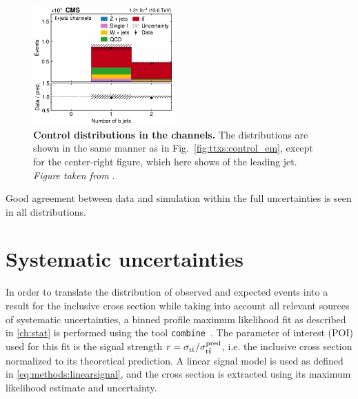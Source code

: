 \begin{figure}[!hp]
\hfill
\includegraphics[width=0.49\textwidth]{figures/ttxs/nbtag_lj.pdf}
\caption{
   \textbf{Control distributions in the \ljets channels.} The distributions are shown in the same manner as in Fig.~\ref{fig:ttxs:control_em}, except for the center-right figure, which here shows \abseta of the leading jet. \textit{Figure taken from }.
}
\label{fig:ttxs:control_ljets}
\end{figure}

Good agreement between data and simulation within the full uncertainties is seen in all distributions.



\section{Systematic uncertainties}
\label{sec:ttxs:systematics}


In order to translate the distribution of observed and expected events into a result for the inclusive \ttbar cross section while taking into account all relevant sources of systematic uncertainties, a binned profile maximum likelihood fit as described in \cref{ch:stat} is performed using the tool \texttt{combine}~\cite{CMS:CAT-23-001}.
The parameter of interest (POI) used for this fit is the signal strength $r = \sigma_{\mathrm{t \bar{t}}} / \sigma_{\mathrm{t \bar{t}}}^{\text{pred}}$, i.e. the inclusive \ttbar cross section normalized to its theoretical prediction. A linear signal model is used as defined in \cref{eq:methods:linearsignal}, and the \ttbar cross section is extracted using its maximum likelihood estimate and uncertainty.

